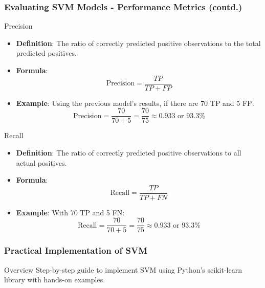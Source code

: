 \documentclass[aspectratio=169]{beamer}
\begin{document}
\begin{frame}[fragile]
    \frametitle{Evaluating SVM Models - Performance Metrics (contd.)}
    \begin{block}{Precision}
        \begin{itemize}
            \item \textbf{Definition}: The ratio of correctly predicted positive observations to the total predicted positives.
            \item \textbf{Formula}:
            \begin{equation}
                \text{Precision} = \frac{TP}{TP + FP}
            \end{equation}
            \item \textbf{Example}: Using the previous model's results, if there are 70 TP and 5 FP:
            \begin{equation}
                \text{Precision} = \frac{70}{70 + 5} = \frac{70}{75} \approx 0.933 \text{ or } 93.3\%
            \end{equation}
        \end{itemize}
    \end{block}

    \begin{block}{Recall}
        \begin{itemize}
            \item \textbf{Definition}: The ratio of correctly predicted positive observations to all actual positives.
            \item \textbf{Formula}:
            \begin{equation}
                \text{Recall} = \frac{TP}{TP + FN}
            \end{equation}
            \item \textbf{Example}: With 70 TP and 5 FN:
            \begin{equation}
                \text{Recall} = \frac{70}{70 + 5} = \frac{70}{75} \approx 0.933 \text{ or } 93.3\%
            \end{equation}
        \end{itemize}
    \end{block}
\end{frame}

\begin{frame}
    \frametitle{Practical Implementation of SVM}
    \begin{block}{Overview}
        Step-by-step guide to implement SVM using Python's scikit-learn library with hands-on examples.
    \end{block}
\end{frame}
\end{document}
